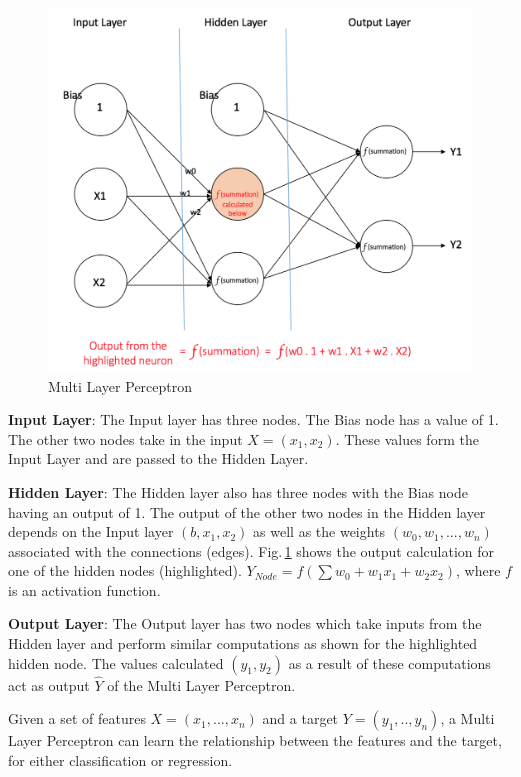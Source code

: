 \begin{figure}[h]
	\centering
	\includegraphics[scale=0.5]{Figs/multilayer.png}
    \caption{Multi Layer Perceptron}
    \label{mlp}
\end{figure}

\textbf{Input Layer}: The Input layer has three nodes. The Bias node has a value of 1. The other two nodes take in the input $X = (x_1,x_2)$. These values form the Input Layer and are passed to the Hidden Layer.

\textbf{Hidden Layer}: The Hidden layer also has three nodes with the Bias node having an output of 1. The output of the other two nodes in the Hidden layer depends on the Input layer $(b, x_1, x_2)$ as well as the weights $(w_0,w_1,...,w_n)$ associated with the connections (edges). Fig.\,\ref{mlp} shows the output calculation for one of the hidden nodes (highlighted). $Y_{Node} = f(\sum{w_0+w_1x_1+w_2x_2})$, where $f$ is an activation function.

\textbf{Output Layer}: The Output layer has two nodes which take inputs from the Hidden layer and perform similar computations as shown for the highlighted hidden node. The values calculated $(y_1,y_2)$ as a result of these computations act as output $\hat{Y}$ of the Multi Layer Perceptron.

Given a set of features $X = (x_1,...,x_n)$ and a target $Y = (y_1,..,y_n)$, a Multi Layer Perceptron can learn the relationship between the features and the target, for either classification or regression.


